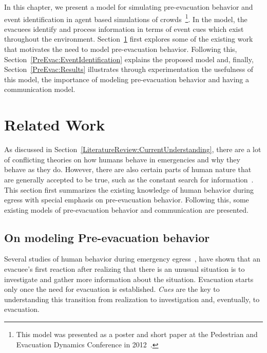 In this chapter, we present a model for simulating pre-evacuation behavior and event identification in agent based simulations of crowds~\footnote{This model was presented as a poster and short paper at the Pedestrian and Evacuation Dynamics Conference in 2012~\cite{Viswanathan:2012vt}.}. In the model, the evacuees identify and process information in terms of event cues which exist throughout the environment. Section~\ref{PreEvac:LitRev} first explores some of the existing work that motivates the need to model pre-evacuation behavior. Following this, Section~\ref{PreEvac:EventIdentification} explains the proposed model and, finally, Section~\ref{PreEvac:Results} illustrates through experimentation the usefulness of this model, the importance of modeling pre-evacuation behavior and having a communication model.



\section{Related Work}
\label{PreEvac:LitRev}


As discussed in Section~\ref{LiteratureReview:CurrentUnderstanding}, there are a lot of conflicting theories on how humans behave in emergencies and why they behave as they do. However, there are also certain parts of human nature that are generally accepted to be true, such as the constant search for information~\cite{Proulx:2003tc,Tong:1985wn,Ozel:2001tn,Sime:1983uy}. This section first summarizes the existing knowledge of human behavior during egress with special emphasis on pre-evacuation behavior. Following this, some existing models of pre-evacuation behavior and communication are presented.

\subsection{On modeling Pre-evacuation behavior}
\label{PreEvac:PreEvacuationBehavior}

Several studies of human behavior during emergency egress~\cite{Kuligowski:2005tt,Ozel:2001tn,Proulx:2007ul}, have shown that an evacuee's first reaction after realizing that there is an unusual situation is to investigate and gather more information about the situation. Evacuation starts only once the need for evacuation is established. \emph{Cues} are the key to understanding this transition from realization to investigation and, eventually, to evacuation.

